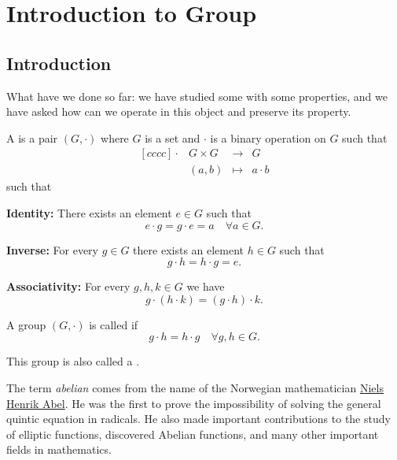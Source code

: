 \chapter{Introduction to Group}

\section{Introduction}

\begin{remark}
    What have we done so far: we have studied some  with some properties, and we have asked how can we operate in this object and preserve its property. 
\end{remark}

\begin{definition}[Group]\label{def:group}
    A  is a pair $(G, \cdot)$ where $G$ is a set and $\cdot$ is a binary operation on $G$ such that \[
        \begin{matrix}[cccc]
            \cdot & G \times G & \to     & G         \\
                  & (a, b)     & \mapsto & a \cdot b
        \end{matrix}
    \] such that \begin{listu}
        \item \textbf{Identity:} There exists an element $e \in G$ such that \[ e \cdot g = g \cdot e = a \quad \forall a \in G. \]
        \item \textbf{Inverse:} For every $g \in G$ there exists an element $h \in G$ such that \[ g \cdot h = h \cdot g = e. \]
        \item \textbf{Associativity:} For every $g, h, k \in G$ we have \[ g \cdot (h \cdot k) = (g \cdot h) \cdot k. \]
    \end{listu}
\end{definition}

\begin{definition}\label{def:abelian_group}
    A group $(G, \cdot)$ is called  if \[ g \cdot h = h \cdot g \quad \forall g, h \in G. \]

    This group is also called a .
\end{definition}

The term \textit{abelian} comes from the name of the Norwegian mathematician \href{https://en.wikipedia.org/wiki/Niels_Henrik_Abel}{Niels Henrik Abel}. He was the first to prove the impossibility of solving the general quintic equation in radicals. He also made important contributions to the study of elliptic functions, discovered Abelian functions, and many other important fields in mathematics.

